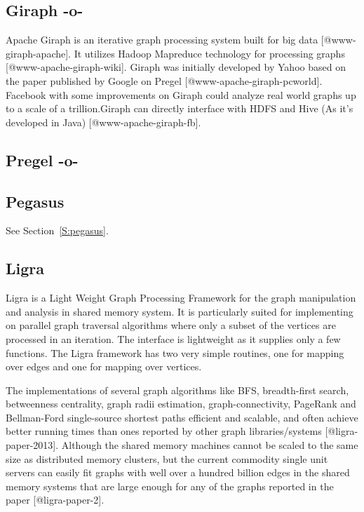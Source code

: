 \subsection{Giraph -o-}

Apache Giraph is an iterative graph processing system built for big
data [@www-giraph-apache]. It utilizes Hadoop Mapreduce technology
for processing graphs [@www-apache-giraph-wiki].  Giraph was
initially developed by Yahoo based on the paper published by Google on
Pregel [@www-apache-giraph-pcworld].  Facebook with some
improvements on Giraph could analyze real world graphs up to a scale
of a trillion.Giraph can directly interface with HDFS and Hive (As
it's developed in Java) [@www-apache-giraph-fb].


   
\subsection{Pregel -o-}



\subsection{Pegasus}

See Section~\ref{S:pegasus}.

\subsection{Ligra}

Ligra is a Light Weight Graph Processing Framework for the graph
manipulation and analysis in shared memory system. It is particularly
suited for implementing on parallel graph traversal algorithms where
only a subset of the vertices are processed in an iteration. The
interface is lightweight as it supplies only a few functions. The
Ligra framework has two very simple routines, one for mapping over
edges and one for mapping over vertices.

The implementations of several graph algorithms like BFS,
breadth-first search, betweenness centrality, graph radii estimation,
graph-connectivity, PageRank and Bellman-Ford single-source shortest
paths efficient and scalable, and often achieve better running times
than ones reported by other graph libraries/systems
[@ligra-paper-2013].  Although the shared memory machines cannot
be scaled to the same size as distributed memory clusters, but the
current commodity single unit servers can easily fit graphs with well
over a hundred billion edges in the shared memory systems that are
large enough for any of the graphs reported in the paper
[@ligra-paper-2].

